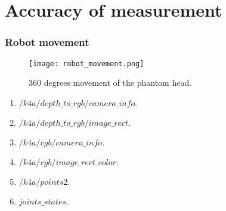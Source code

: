 \section{Accuracy of measurement}
\begin{frame}
	\frametitle{Robot movement}
	\begin{figure}[hbt!]
		\centering
		\texttt{[image: robot\_movement.png]}
		\caption{360 degrees movement of the phantom head.} 
		\label{fig:robot_movement}
	\end{figure}
				
	\begin{enumerate}
		\item $/k4a/depth\_to\_rgb/camera\_info.$
		\item $/k4a/depth\_to\_rgb/image\_rect.$
		\item $/k4a/rgb/camera\_info.$
		\item $/k4a/rgb/image\_rect\_color.$
		\item $/k4a/points2.$
		\item $joints\_states.$
	\end{enumerate}
\end{frame}


